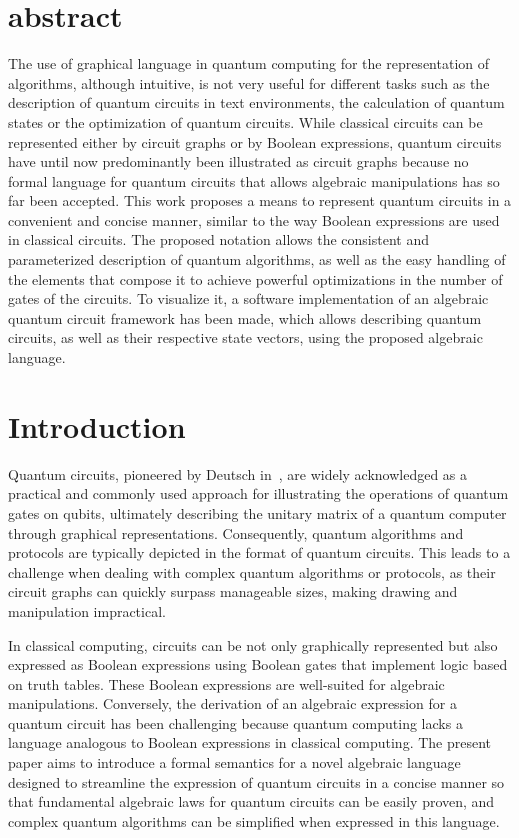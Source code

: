 


\section{abstract}
    The use of graphical language in quantum computing for the representation of algorithms, although intuitive, is not very useful for different tasks such as the description of quantum circuits in text environments, the calculation of quantum states or the optimization of quantum circuits. While classical circuits can be represented either by circuit graphs or by Boolean expressions, quantum circuits have until now predominantly been illustrated as circuit graphs because no formal language for quantum circuits that allows algebraic manipulations has so far been accepted. This work proposes a means to represent quantum circuits in a convenient and concise manner, similar to the way Boolean expressions are used in classical circuits. The proposed notation allows the consistent and parameterized description of quantum algorithms, as well as the easy handling of the elements that compose it to achieve powerful optimizations in the number of gates of the circuits. To visualize it, a software implementation of an algebraic quantum circuit framework has been made, which allows describing quantum circuits, as well as their respective state vectors, using the proposed algebraic language.

\section{Introduction}

Quantum circuits, pioneered by Deutsch in~\cite{Deutsch1989}, are widely acknowledged as a practical and commonly used approach for illustrating the operations of quantum gates on qubits, ultimately describing the unitary matrix of a quantum computer through graphical representations. Consequently, quantum algorithms and protocols are typically depicted in the format of quantum circuits. This leads to a challenge when dealing with complex quantum algorithms or protocols, as their circuit graphs can quickly surpass manageable sizes, making drawing and manipulation impractical.

In classical computing, circuits can be not only graphically represented but also expressed as Boolean expressions using Boolean gates that implement logic based on truth tables. These Boolean expressions are well-suited for algebraic manipulations. Conversely, the derivation of an algebraic expression for a quantum circuit has been challenging because quantum computing lacks a language analogous to Boolean expressions in classical computing. The present paper aims to introduce a formal semantics for a novel algebraic language designed to streamline the expression of quantum circuits in a concise manner so that fundamental algebraic laws for quantum circuits can be easily proven, and complex quantum algorithms can be simplified when expressed in this language.

